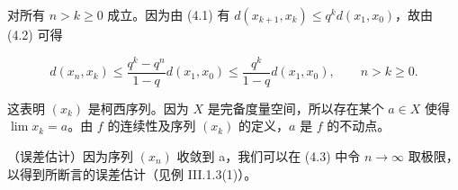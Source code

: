 \begin{theorem}
\begin{items}
对所有 $ n > k \geq 0 $ 成立。因为由 (4.1) 有 $ d(x_{k+1}, x_k) \leq q^k d(x_1, x_0) $，故由 (4.2) 可得

\begin{equation}
d(x_{n},x_{k})\leq\frac{q^{k}-q^{n}}{1-q}d(x_{1},x_{0})\leq\frac{q^{k}}{1-q}d(x_{1},x_{0}),\qquad n>k\geq0.
\end{equation}

这表明 $(x_k)$ 是柯西序列。因为 $X$ 是完备度量空间，所以存在某个 $a \in X$ 使得 $\lim x_k = a$。由 $f$ 的连续性及序列 $(x_k)$ 的定义，$a$ 是 $f$ 的不动点。

\item

（误差估计）因为序列 $ (x_n) $ 收敛到 a，我们可以在 (4.3) 中令 $ n \to \infty $ 取极限，以得到所断言的误差估计（见例 III.1.3(1)）。

\end{items}

\end{theorem}

